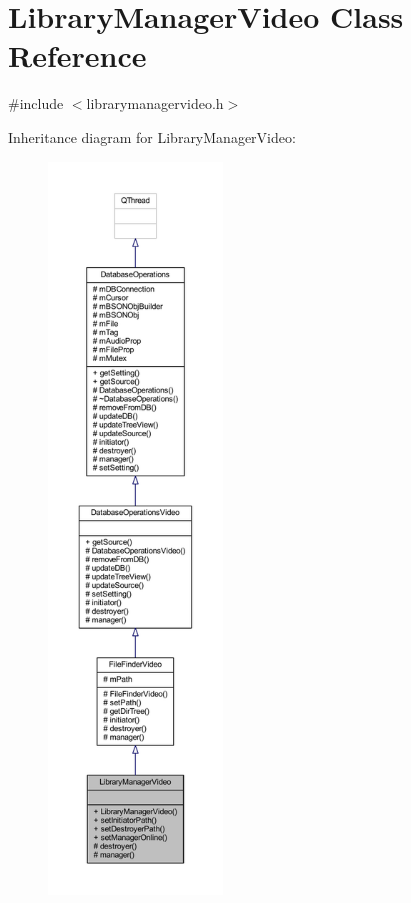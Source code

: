 \hypertarget{class_library_manager_video}{\section{Library\-Manager\-Video Class Reference}
\label{class_library_manager_video}
}


{\ttfamily \#include $<$librarymanagervideo.\-h$>$}



Inheritance diagram for Library\-Manager\-Video\-:
\nopagebreak
\begin{figure}[H]
\begin{center}
\leavevmode
\includegraphics[height=550pt]{class_library_manager_video__inherit__graph}
\end{center}
\end{figure}


